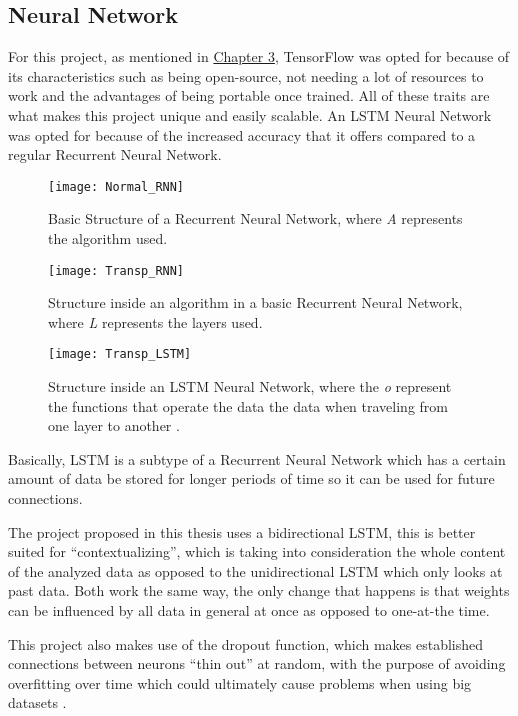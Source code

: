 \subsection{Neural Network}
For this project, as mentioned in \hyperref[ch3]{Chapter 3}, TensorFlow was opted for because of its characteristics such as being open-source, not needing a lot of resources to work and the advantages of being portable once trained. All of these traits are what makes this project unique and easily scalable.
An LSTM Neural Network was opted for because of the increased accuracy that it offers compared to a regular Recurrent Neural Network.
\pagebreak
\begin{figure}[!h]
	\centering
	\texttt{[image: Normal\_RNN]}
	\caption[Basic Structure of a Recurrent Neural Network.]{Basic Structure of a Recurrent Neural Network, where \textit{A} represents the algorithm used.}
	\label{fig:neuraldiagram_1}
\end{figure}
\begin{figure}[!h]
	\centering
	\texttt{[image: Transp\_RNN]}
	\caption[Structure inside an algorithm in a basic Recurrent Neural Network.]{Structure inside an algorithm in a basic Recurrent Neural Network, where \textit{L} represents the layers used.}
	\label{fig:neuraldiagram_2}
\end{figure}
\begin{figure}[!h]
	\centering
	\texttt{[image: Transp\_LSTM]}
	\caption[Structure inside an LSTM Neural Network.]{Structure inside an LSTM Neural Network, where the \textit{o} represent the functions that operate the data the data when traveling from one layer to another \citep{rf21}.}
	\label{fig:neuraldiagram_3}
\end{figure}

Basically, LSTM is a subtype of a Recurrent Neural Network which has a certain amount of data be stored for longer periods of time so it can be used for future connections.

The project proposed in this thesis uses a bidirectional LSTM, this is better suited for ``contextualizing'', which is taking into consideration the whole content of the analyzed data as opposed to the unidirectional LSTM which only looks at past data.
Both work the same way, the only change that happens is that weights can be influenced by all data in general at once as opposed to one-at-the time.

This project also makes use of the dropout function, which makes established connections between neurons ``thin out'' at random, with the purpose of avoiding overfitting over time which could ultimately cause problems when using big datasets \citep{rf22}.

